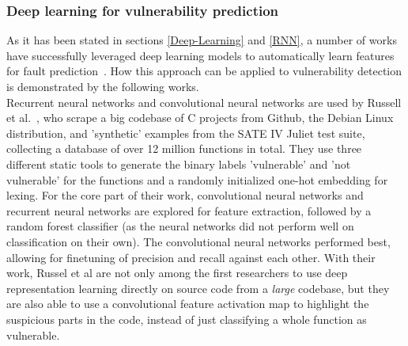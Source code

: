 \documentclass[
a4paper,
pagesize,
pdftex,
12pt,
twoside, %
BCOR=5mm, %
ngerman,
fleqn,
final,
]{scrartcl}
\begin{document}
	\subsubsection{Deep learning for vulnerability prediction}\label{deep-vulnerability-prediction}
	As it has been stated in sections \ref{Deep-Learning} and \ref{RNN}, a number of works have successfully leveraged deep learning models to automatically learn features for fault prediction~\cite{IEEE.2015b,IEEE.2016,Wang.2016}. How this approach can be applied to vulnerability detection is demonstrated by the following works.\\
	Recurrent neural networks and convolutional neural networks are used by Russell et al.~\cite{Russell.2018}, who scrape a big codebase of C projects from Github, the Debian Linux distribution, and 'synthetic' examples from the SATE IV Juliet test suite, collecting a database of over 12 million functions in total. They use three different static tools to generate the binary labels 'vulnerable' and 'not vulnerable' for the functions and a randomly initialized one-hot embedding for lexing. For the core part of their work, convolutional neural networks and recurrent neural networks are explored for feature extraction, followed by a random forest classifier (as the neural networks did not perform well on classification on their own). The convolutional neural networks performed best, allowing for finetuning of precision and recall against each other. With their work, Russel et al are not only among the first researchers to use deep representation learning directly on source code from a \textit{large} codebase, but they are also able to use a convolutional feature activation map to highlight the suspicious parts in the code, instead of just classifying a whole function as vulnerable.\\
\end{document}
